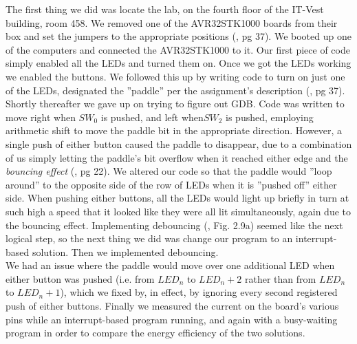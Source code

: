 The first thing we did was locate the lab, on the fourth floor of the IT-Vest building, room 458. 
We removed one of the AVR32STK1000 boards from their box and set the jumpers to the appropriate positions (\cite{lab-compendium}, pg 37).
We booted up one of the computers and connected the AVR32STK1000 to it. 
Our first piece of code simply enabled all the LEDs and turned them on. Once we got the LEDs working we enabled the buttons.
We followed this up by writing code to turn on just one of the LEDs, designated the ''paddle'' per the assignment's description (\cite{lab-compendium}, pg 37).
Shortly thereafter we gave up on trying to figure out GDB.
Code was written to move right when \texttt{$SW_0$} is pushed, and left when\texttt{$SW_2$} is pushed, employing arithmetic shift to move the paddle bit in the appropriate direction.
However, a single push of either button caused the paddle to disappear, due to a combination of us simply letting the paddle's bit overflow when it reached either edge and the \emph{bouncing effect} (\cite{lab-compendium}, pg 22). We altered our code so that the paddle would ''loop around'' to the opposite side of the row of LEDs when it is ''pushed off'' either side.
When pushing either buttons, all the LEDs would light up briefly in turn at such high a speed that it looked like they were all lit simultaneously, again due to the bouncing effect.
Implementing debouncing (\cite{lab-compendium}, Fig. 2.9a) seemed like the next logical step, so the next thing we did was change our program to an interrupt-based solution.
Then we implemented debouncing.
\\ %
We had an issue where the paddle would move over one additional LED when either button was pushed (i.e. from \texttt{$LED_n$} to \texttt{$LED_n+2$} rather than from \texttt{$LED_n$} to \texttt{$LED_n+1$}), which we fixed by, in effect, by ignoring every second registered push of either buttons.
Finally we measured the current on the board's various pins while an interrupt-based program running, and again with a busy-waiting program in order to compare the energy efficiency of the two solutions.
